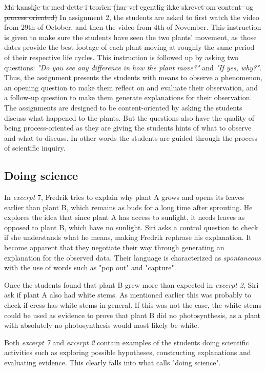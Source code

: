 \sout{Må kanskje ta med dette i teorien (har vel egentlig ikke skrevet om content- og process oriented)}
In assignment 2, the students are asked to first watch the video from 29th of October, and then the video from 4th of November. This instruction is given to make sure the students have seen the two plants' movement, as those dates provide the best footage of each plant moving at roughly the same period of their respective life cycles. This instruction is followed up by asking two questions: \emph{"Do you see any difference in how the plant move?"} and \emph{"If yes, why?"}. Thus, the assignment presents the students with means to observe a phenomenon, an opening question to make them reflect on and evaluate their observation, and a follow-up question to make them generate explanations for their observation. The assignments are designed to be content-oriented by asking the students discuss what happened to the plants. But the questions also have the quality of being process-oriented as they are giving the students hints of what to observe and what to discuss. In other words the students are guided through the process of scientific inquiry.

\subsection{Doing science}
In \emph{excerpt} 7, Fredrik tries to explain why plant A grows and opens its leaves earlier than plant B, which remains as buds for a long time after sprouting. He explores the idea that since plant A has access to sunlight, it needs leaves as opposed to plant B, which have no sunlight. Siri asks a control question to check if she understands what he means, making Fredrik rephrase his explanation. It become apparent that they negotiate their way through generating an explanation for the observed data. Their language is characterized as \emph{spontaneous} with the use of words such as "pop out" and "capture". 

Once the students found that plant B grew more than expected in \emph{excerpt 2}, Siri ask if plant A also had white stems. As mentioned earlier this was probably to check if cress has white stems in general. If this was not the case, the white stems could be used as evidence to prove that plant B did no photosynthesis, as a plant with absolutely no photosynthesis would most likely be white. 

Both \emph{excerpt 7} and \emph{excerpt 2} contain examples of the students doing scientific activities such as exploring possible hypotheses, constructing explanations and evaluating evidence. This clearly falls into what \citet{jimenez2000doing} calls "doing science".

